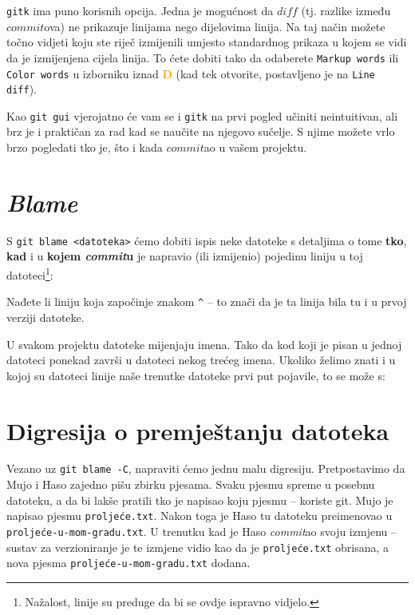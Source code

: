 \verb+gitk+ ima puno korisnih opcija.
Jedna je mogućnost da $diff$ (tj. razlike između $commit$ova) ne prikazuje linijama nego dijelovima linija.
Na taj način možete točno vidjeti koju ste riječ izmijenili umjesto standardnog prikaza u kojem se vidi da je izmijenjena cijela linija.
To ćete dobiti tako da odaberete \verb+Markup words+ ili \verb+Color words+ u izborniku iznad \textcolor{orange}{\textbf{D}} (kad tek otvorite, postavljeno je na \verb+Line diff+).

Kao \verb+git gui+ vjerojatno će vam se i \verb+gitk+ na prvi pogled učiniti neintuitivan, ali brz je i praktičan za rad kad se naučite na njegovo sučelje.
S njime možete vrlo brzo pogledati tko je, što i kada $commit$ao u vašem projektu.

\section*{\emph{Blame}}

S \verb+git blame <datoteka>+ ćemo dobiti ispis neke datoteke s detaljima o tome \textbf{tko}, \textbf{kad} i u \textbf{kojem \emph{commit}u} je napravio (ili izmijenio) pojedinu liniju u toj datoteci\footnote{Nažalost, linije su preduge da bi se ovdje ispravno vidjelo.}:



Nađete li liniju koja započinje znakom \verb+^+ -- to znači da je ta linija bila tu i u prvoj verziji datoteke.

U svakom projektu datoteke mijenjaju imena. 
Tako da kod koji je pisan u jednoj datoteci ponekad završi u datoteci nekog trećeg imena.
Ukoliko želimo znati i u kojoj su datoteci linije naše trenutke datoteke prvi put pojavile, to se može s:


\section*{Digresija o premještanju datoteka}

Vezano uz \verb+git blame -C+, napraviti ćemo jednu malu digresiju.
Pretpostavimo da Mujo i Haso zajedno pišu zbirku pjesama.
Svaku pjesmu spreme u posebnu datoteku, a da bi lakše pratili tko je napisao koju pjesmu -- koriste git.
Mujo je napisao pjesmu \verb+proljeće.txt+.
Nakon toga je Haso tu datoteku preimenovao u \verb+proljeće-u-mom-gradu.txt+.
U trenutku kad je Haso \emph{commit}ao svoju izmjenu -- sustav za verzioniranje je te izmjene vidio kao da je \verb+proljeće.txt+ obrisana, a nova pjesma  \verb+proljeće-u-mom-gradu.txt+ dodana.


